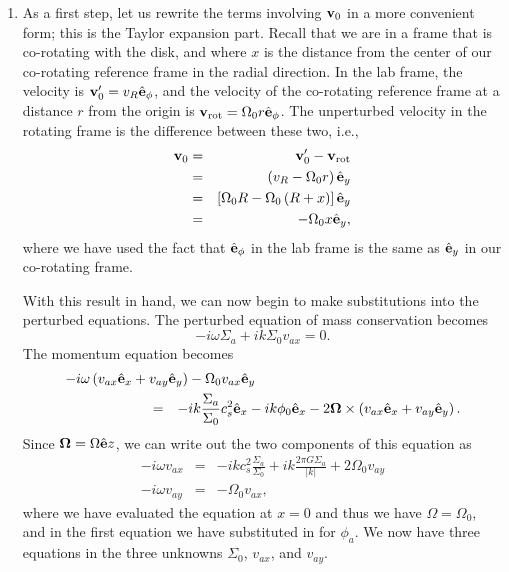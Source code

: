 \begin{enumerate}
\begin{enumerate}
\item As a first step, let us rewrite the terms involving $\mathbf{v}_0$ in a more convenient form; this is the Taylor expansion part. Recall that we are in a frame that is co-rotating with the disk, and where $x$ is the distance from the center of our co-rotating reference frame in the radial direction. In the lab frame, the velocity is $\mathbf{v}_0' = v_R \hat{\mathbf{e}}_\phi$, and the velocity of the co-rotating reference frame at a distance $r$ from the origin is $\mathbf{v}_{\rm rot} = \Omega_0 r \hat{\mathbf{e}}_\phi$. The unperturbed velocity in the rotating frame is the difference between these two, i.e.,
\begin{eqnarray*}
\mathbf{v}_0 & = & \mathbf{v}_0' - \mathbf{v}_{\rm rot} \\
& = & \left(v_R - \Omega_0 r\right) \hat{\mathbf{e}}_y \\
& = & \left[\Omega_0 R - \Omega_0 \left(R + x\right)\right] \hat{\mathbf{e}}_y \\
& = & -\Omega_0 x \hat{\mathbf{e}}_y,
\end{eqnarray*}
where we have used the fact that $\hat{\mathbf{e}}_\phi$ in the lab frame is the same as $\hat{\mathbf{e}}_y$ in our co-rotating frame.

With this result in hand, we can now begin to make substitutions into the perturbed equations. The perturbed equation of mass conservation becomes
\begin{displaymath}
-i\omega \Sigma_a + i k \Sigma_0 v_{ax} = 0.
\end{displaymath}
The momentum equation becomes
\begin{eqnarray*}
\lefteqn{-i\omega \left(v_{ax} \ehat_x + v_{ay} \ehat_y\right) - \Omega_0 v_{ax} \ehat_y}
\qquad\qquad\qquad
\\
& = & -ik\frac{\Sigma_a}{\Sigma_0} c_s^2 \ehat_x - ik\phi_0 \ehat_x
- 2 \veco \times \left(v_{ax} \ehat_x + v_{ay} \ehat_y\right).
\end{eqnarray*}
Since ${\bm \Omega} = \Omega \hat{\mathbf{e}} z$, we can write out the two components of this equation as
\begin{eqnarray*}
-i\omega v_{ax} & = & -ik c_s^2 \frac{\Sigma_a}{\Sigma_0} + i k \frac{2\pi G \Sigma_a}{|k|} + 2\Omega_0 v_{ay} \\
-i\omega v_{ay} & = & -\Omega_0 v_{ax},
\end{eqnarray*}
where we have evaluated the equation at $x=0$ and thus we have $\Omega = \Omega_0$, and in the first equation we have substituted in for $\phi_a$. We now have three equations in the three unknowns $\Sigma_0$, $v_{ax}$, and $v_{ay}$.


\end{enumerate}
\end{enumerate}
